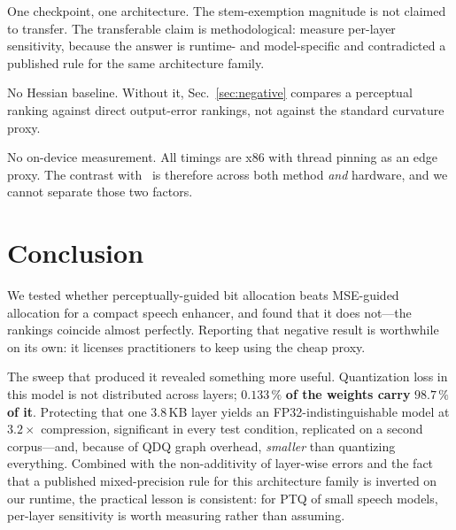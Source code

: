 \documentclass[conference]{IEEEtran}
\begin{document}
One checkpoint, one architecture. The stem-exemption magnitude is not claimed to transfer. The
transferable claim is methodological: measure per-layer sensitivity, because the answer is
runtime- and model-specific and contradicted a published rule for the same architecture family.

No Hessian baseline. Without it, Sec.~\ref{sec:negative} compares a perceptual ranking against
direct output-error rankings, not against the standard curvature proxy.

No on-device measurement. All timings are x86 with thread pinning as an edge proxy. The contrast
with~\cite{rusci2022} is therefore across both method \emph{and} hardware, and we cannot separate
those two factors.

\section{Conclusion}

We tested whether perceptually-guided bit allocation beats MSE-guided allocation for a compact
speech enhancer, and found that it does not---the rankings coincide almost perfectly. Reporting
that negative result is worthwhile on its own: it licenses practitioners to keep using the cheap
proxy.

The sweep that produced it revealed something more useful. Quantization loss in this model is not
distributed across layers; $\mathbf{0.133\,\%}$ \textbf{of the weights carry} $\mathbf{98.7\,\%}$
\textbf{of it}. Protecting that one 3.8\,KB layer yields an FP32-indistinguishable model at
$3.2\times$ compression, significant in every test condition, replicated on a second corpus---and,
because of QDQ graph overhead, \emph{smaller} than quantizing everything. Combined with the
non-additivity of layer-wise errors and the fact that a published mixed-precision rule for this
architecture family is inverted on our runtime, the practical lesson is consistent: for PTQ of
small speech models, per-layer sensitivity is worth measuring rather than assuming.
\end{document}
